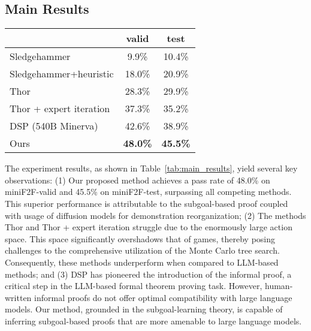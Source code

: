 \documentclass{article}
\begin{document}
\subsection{Main Results}



\begin{table*}[t!]
\centering
\caption{Pass rates on the miniF2F dataset with Isabelle. Numbers in bold denote the best performance. Numbers with a  correspond to the cumulative pass rate~\cite{lample2022hypertree} since the evaluated statements are part of the training for diffusion models. See \S\ref{sec:evaluation} for more details about cumulative pass rate.}
\label{tab:main_results}
\begin{tabular}{lcc}
\toprule
\multicolumn{1}{c}{\textbf{}} & valid   & test    \\ \midrule
Sledgehammer                  & 9.9\%           & 10.4\%          \\
Sledgehammer+heuristic        & 18.0\%          & 20.9\%          \\
Thor                          & 28.3\%          & 29.9\%          \\
Thor + expert iteration       & 37.3\%          & 35.2\%          \\ 
DSP (540B Minerva)            & 42.6\%          & 38.9\%          \\ \midrule
Ours                          & \textbf{48.0\%} & \textbf{45.5\%} \\
\bottomrule
\end{tabular}
\end{table*}

The experiment results, as shown in Table~\ref{tab:main_results}, yield several key observations: (1) Our proposed method achieves a pass rate of 48.0\% on miniF2F-valid and 45.5\% on miniF2F-test, surpassing all competing methods. This superior performance is attributable to the subgoal-based proof coupled with usage of diffusion models for demonstration reorganization; (2) The methods Thor and Thor + expert iteration struggle due to the enormously large action space. This space significantly overshadows that of games, thereby posing challenges to the comprehensive utilization of the Monte Carlo tree search.  Consequently, these methods underperform when compared to LLM-based methods; and (3) DSP has pioneered the introduction of the informal proof, a critical step in the LLM-based formal theorem proving task. However, human-written informal proofs do not offer optimal compatibility with large language models. Our method, grounded in the subgoal-learning theory, is capable of inferring subgoal-based proofs that are more amenable to large language models.
\end{document}
